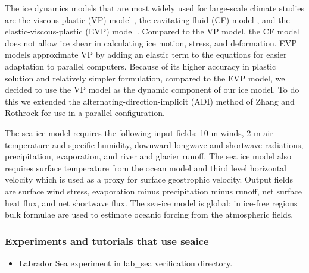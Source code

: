 The ice dynamics models that are most widely used for large-scale
climate studies are the viscous-plastic (VP) model \cite{hib79}, the
cavitating fluid (CF) model \cite{fla92}, and the
elastic-viscous-plastic (EVP) model \cite{hun97}.  Compared to the VP
model, the CF model does not allow ice shear in calculating ice
motion, stress, and deformation.  EVP models approximate VP by adding
an elastic term to the equations for easier adaptation to parallel
computers.  Because of its higher accuracy in plastic solution and
relatively simpler formulation, compared to the EVP model, we decided
to use the VP model as the dynamic component of our ice model.  To do
this we extended the alternating-direction-implicit (ADI) method of
Zhang and Rothrock \cite{zha00} for use in a parallel configuration.

The sea ice model requires the following input fields: 10-m winds, 2-m
air temperature and specific humidity, downward longwave and shortwave
radiations, precipitation, evaporation, and river and glacier runoff.
The sea ice model also requires surface temperature from the ocean
model and third level horizontal velocity which is used as a proxy for
surface geostrophic velocity.  Output fields are surface wind stress,
evaporation minus precipitation minus runoff, net surface heat flux,
and net shortwave flux.  The sea-ice model is global: in ice-free
regions bulk formulae are used to estimate oceanic forcing from the
atmospheric fields.



\subsubsection{Experiments and tutorials that use seaice}
\label{sec:pkg:seaice:experiments}

\begin{itemize}
\item{Labrador Sea experiment in lab\_sea verification directory. }
\end{itemize}


